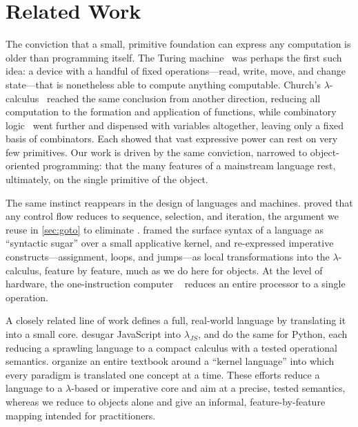 
\section{Related Work}

The conviction that a small, primitive foundation can express any computation
  is older than programming itself.
The Turing machine~\citep{turing1936computable} was perhaps the first such
  idea: a device with a handful of fixed operations---read, write, move, and
  change state---that is nonetheless able to compute anything computable.
Church's \(\lambda\)-calculus~\citep{church1936some,barendregt2012} reached
  the same conclusion from another direction, reducing all computation to the
  formation and application of functions, while combinatory
  logic~\citep{curry1958combinatory} went further and dispensed with variables
  altogether, leaving only a fixed basis of combinators.
Each showed that vast expressive power can rest on very few primitives.
Our work is driven by the same conviction, narrowed to object-oriented
  programming: that the many features of a mainstream language rest,
  ultimately, on the single primitive of the object.

The same instinct reappears in the design of languages and machines.
\citet{bohm1966flow} proved that any control flow reduces to sequence,
  selection, and iteration, the argument we reuse in \cref{sec:goto}
  to eliminate .
\citet{landin1966next} framed the surface syntax of a language as
  ``syntactic sugar'' over a small applicative kernel, and
  \citet{steele1976imperative} re-expressed imperative constructs---assignment,
  loops, and jumps---as local transformations into the \(\lambda\)-calculus,
  feature by feature, much as we do here for objects.
At the level of hardware, the one-instruction computer%
  ~\citep{mavaddat1988urisc} reduces an entire processor to a single operation.

A closely related line of work defines a full, real-world language by
  translating it into a small core.
\citet{guha2010essence} desugar JavaScript into \(\lambda_{JS}\), and
  \citet{politz2013python} do the same for Python, each reducing a sprawling
  language to a compact calculus with a tested operational semantics.
\citet{vanroy2004concepts} organize an entire textbook around a ``kernel
  language'' into which every paradigm is translated one concept at a time.
These efforts reduce a language to a \(\lambda\)-based or imperative core and
  aim at a precise, tested semantics, whereas we reduce to objects alone and
  give an informal, feature-by-feature mapping intended for practitioners.

